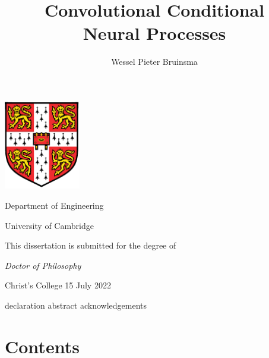 
\usepackage{import}




\ifprintedversion
    \hypersetup{hidelinks}
\fi

\title{Convolutional Conditional \texorpdfstring{\\[0.5em]}{} Neural Processes}
\author{Wessel Pieter Bruinsma}


\hypersetup{pageanchor=false}

\begin{titlepage}
    \makeatletter
    \centering

    \null
    {\bfseries\Huge \@title}

    \vfill
    \vspace{1cm}
    \includegraphics[width=0.25\textwidth]{resources/cambridge_crest.pdf}

    \vfill
    {\Large\bfseries \@author \par}
    {\large Department of Engineering\par}
    {\large University of Cambridge}

    \vfill
    {\large This dissertation is submitted for the degree of\par}
    {\large\itshape Doctor of Philosophy}

    \vfill
    {\large Christ's College \hfill 15 July 2022}

    \makeatother
\end{titlepage}

\null
\thispagestyle{empty}

\ifprintedversion
    \newpage
\fi

{declaration}
{abstract}
{acknowledgements}

\chapter*{Contents}
\vspace{-16pt}  %
\makeatletter{}\makeatother

